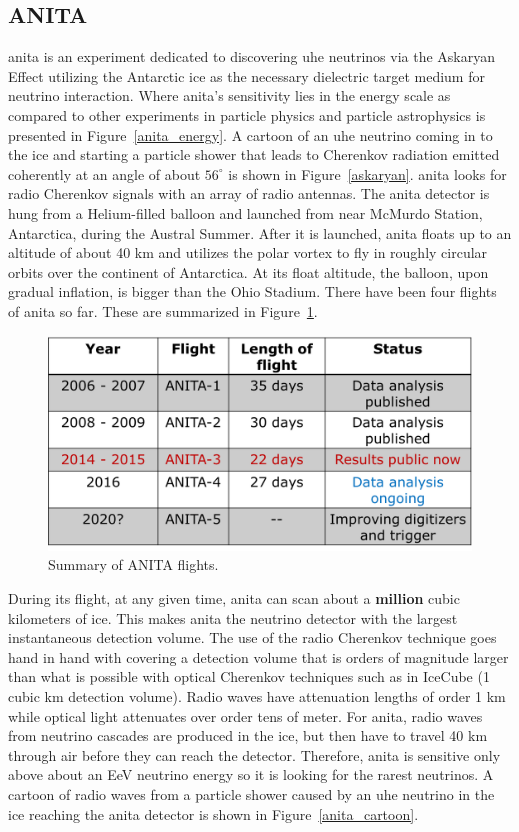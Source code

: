 \subsection{ANITA}

\gls{anita} is an experiment dedicated to discovering \gls{uhe} neutrinos via the Askaryan Effect utilizing the Antarctic ice as the necessary dielectric target medium for neutrino interaction. Where \gls{anita}'s sensitivity lies in the energy scale as compared to other experiments in particle physics and particle astrophysics is presented in Figure~\ref{anita_energy}. A cartoon of an \gls{uhe} neutrino coming in to the ice and starting a particle shower that leads to Cherenkov radiation emitted coherently at an angle of about $56^{\circ}$ is shown in Figure~\ref{askaryan}. \gls{anita} looks for radio Cherenkov signals with an array of radio antennas. The \gls{anita} detector is hung from a Helium-filled balloon and launched from near McMurdo Station, Antarctica, during the Austral Summer. After it is launched, \gls{anita} floats up to an altitude of about 40 km and utilizes the polar vortex to fly in roughly circular orbits over the continent of Antarctica. At its float altitude, the balloon, upon gradual inflation, is bigger than the Ohio Stadium. There have been four flights of \gls{anita} so far. These are summarized in Figure~\ref{flights_summary}.

\begin{figure}
\centering
\includegraphics[width=1.0\textwidth]{figures/flights_table.png}
\caption{Summary of ANITA flights.}
\label{flights_summary}
\end{figure}

During its flight, at any given time, \gls{anita} can scan about a {\bf million} cubic kilometers of ice. This makes \gls{anita} the neutrino detector with the largest instantaneous detection volume. The use of the radio Cherenkov technique goes hand in hand with covering a detection volume that is orders of magnitude larger than what is possible with optical Cherenkov techniques such as in IceCube (1 cubic km detection volume). Radio waves have attenuation lengths of order 1 km while optical light attenuates over order tens of meter. For \gls{anita}, radio waves from neutrino cascades are produced in the ice, but then have to travel 40 km through air before they can reach the detector. Therefore, \gls{anita} is sensitive only above about an EeV neutrino energy so it is looking for the rarest neutrinos. A cartoon of radio waves from a particle shower caused by an \gls{uhe} neutrino in the ice reaching the \gls{anita} detector is shown in Figure~\ref{anita_cartoon}.

